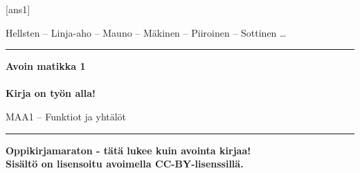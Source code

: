 \documentclass[a4paper,onecolumn,12pt,finnish,oneside,final]{boek3}
\begin{document}
[ans1] %


\begin{titlepage}

  \begin{center}
    \begin{doublespace}
      \begin{LARGE}
        \textrm{Hellsten -- Linja-aho -- Mauno -- Mäkinen -- Piiroinen -- Sottinen \ldots} \\
      \end{LARGE}
      
      \vspace{0.5cm}
      \hrule height 2pt
      \vspace{1cm}
      \begin{Huge}
        \textbf{\textrm{Avoin matikka 1}\\\ \\Kirja on työn alla!}
      \end{Huge}
      
      \vfill
      
      \begin{huge}
        \textrm{MAA1 -- Funktiot ja yhtälöt}
      \end{huge}
      \vspace{1cm}
      \hrule height 2pt
    \end{doublespace}
  \end{center}
  
  \vfill
  \begin{flushright}
    \textbf{Oppikirjamaraton - tätä lukee kuin avointa kirjaa! \\
      Sisältö on lisensoitu avoimella CC-BY-lisenssillä. \\
    }
  \end{flushright}
  
\end{titlepage}

\tableofcontents







\end{document}
